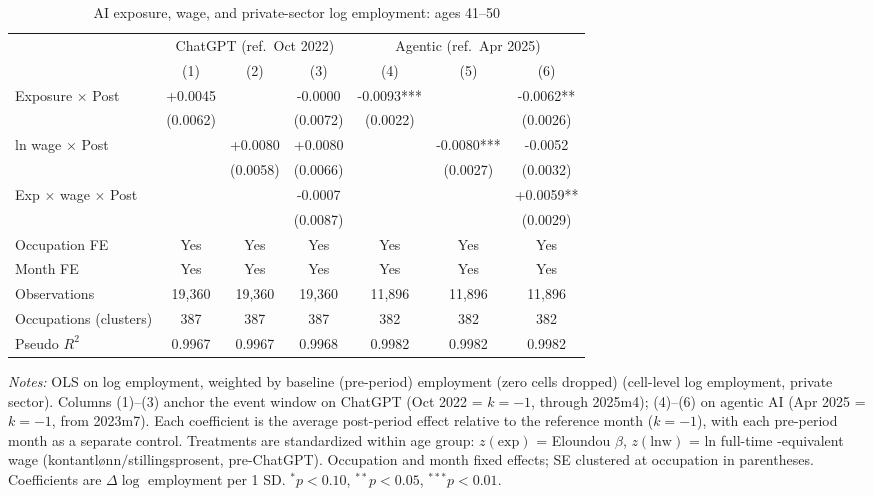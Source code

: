 \begin{table}[htbp]\centering
\caption{AI exposure, wage, and private-sector log employment: ages 41–50}
\label{tab:ca_did_age3}
\small
\begin{tabular}{lcccccc}
\toprule
 & \multicolumn{3}{c}{ChatGPT (ref.\ Oct 2022)} & \multicolumn{3}{c}{Agentic (ref.\ Apr 2025)} \\
\cmidrule(lr){2-4} \cmidrule(lr){5-7}
 & (1) & (2) & (3) & (4) & (5) & (6) \\
\midrule
Exposure $\times$ Post & +0.0045 &  & -0.0000 & -0.0093*** &  & -0.0062** \\
 & (0.0062) &  & (0.0072) & (0.0022) &  & (0.0026) \\
ln wage $\times$ Post &  & +0.0080 & +0.0080 &  & -0.0080*** & -0.0052 \\
 &  & (0.0058) & (0.0066) &  & (0.0027) & (0.0032) \\
Exp $\times$ wage $\times$ Post &  &  & -0.0007 &  &  & +0.0059** \\
 &  &  & (0.0087) &  &  & (0.0029) \\
\midrule
Occupation FE & Yes & Yes & Yes & Yes & Yes & Yes \\
Month FE & Yes & Yes & Yes & Yes & Yes & Yes \\
Observations & 19,360 & 19,360 & 19,360 & 11,896 & 11,896 & 11,896 \\
Occupations (clusters) & 387 & 387 & 387 & 382 & 382 & 382 \\
Pseudo $R^2$ & 0.9967 & 0.9967 & 0.9968 & 0.9982 & 0.9982 & 0.9982 \\
\bottomrule
\end{tabular}
\begin{minipage}{\linewidth}\vspace{2pt}\footnotesize
\emph{Notes:} OLS on log employment, weighted by baseline (pre-period) employment (zero cells dropped) (cell-level log employment, private sector). Columns (1)--(3) anchor the event window on ChatGPT (Oct 2022 = $k{=}{-}1$, through 2025m4); (4)--(6) on agentic AI (Apr 2025 = $k{=}{-}1$, from 2023m7). Each coefficient is the average post-period effect relative to the reference month ($k{=}{-}1$), with each pre-period month as a separate control. Treatments are standardized within age group: $z(\text{exp})$ = Eloundou $\beta$, $z(\text{lnw})$ = ln full-time -equivalent wage (kontantl\o nn$/$stillingsprosent, pre-ChatGPT). Occupation and month fixed effects; SE clustered at occupation in parentheses. Coefficients are $\Delta\log$ employment per 1 SD. $^{*}p<0.10$, $^{**}p<0.05$, $^{***}p<0.01$.
\end{minipage}
\end{table}